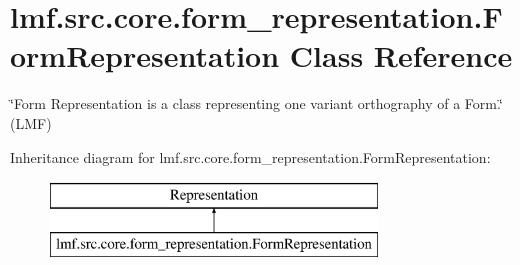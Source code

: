 \hypertarget{classlmf_1_1src_1_1core_1_1form__representation_1_1_form_representation}{\section{lmf.\+src.\+core.\+form\+\_\+representation.\+Form\+Representation Class Reference}
\label{classlmf_1_1src_1_1core_1_1form__representation_1_1_form_representation}
}


\char`\"{}\+Form Representation is a class representing one variant orthography of a Form.\char`\"{} (L\+M\+F)  


Inheritance diagram for lmf.\+src.\+core.\+form\+\_\+representation.\+Form\+Representation\+:\begin{figure}[H]
\begin{center}
\leavevmode
\includegraphics[height=2.000000cm]{classlmf_1_1src_1_1core_1_1form__representation_1_1_form_representation}
\end{center}
\end{figure}
